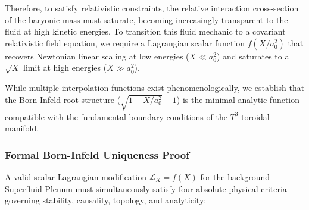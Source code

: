 \documentclass[aps,prd,10pt,twocolumn,superscriptaddress,nofootinbib,floatfix]{revtex4-2}
\begin{document}
Therefore, to satisfy relativistic constraints, the relative interaction cross-section of the baryonic mass must saturate, becoming increasingly transparent to the fluid at high kinetic energies. To transition this fluid mechanic to a covariant relativistic field equation, we require a Lagrangian scalar function $f(X/a_0^2)$ that recovers Newtonian linear scaling at low energies ($X \ll a_0^2$) and saturates to a $\sqrt{X}$ limit at high energies ($X \gg a_0^2$).

While multiple interpolation functions exist phenomenologically, we establish that the Born-Infeld root structure ($\sqrt{1+X/a_0^2}-1$) is the minimal analytic function compatible with the fundamental boundary conditions of the $T^3$ toroidal manifold.

\subsubsection{Formal Born-Infeld Uniqueness Proof}
A valid scalar Lagrangian modification $\mathcal{L}_X = f(X)$ for the background Superfluid Plenum must simultaneously satisfy four absolute physical criteria governing stability, causality, topology, and analyticity:
\end{document}
